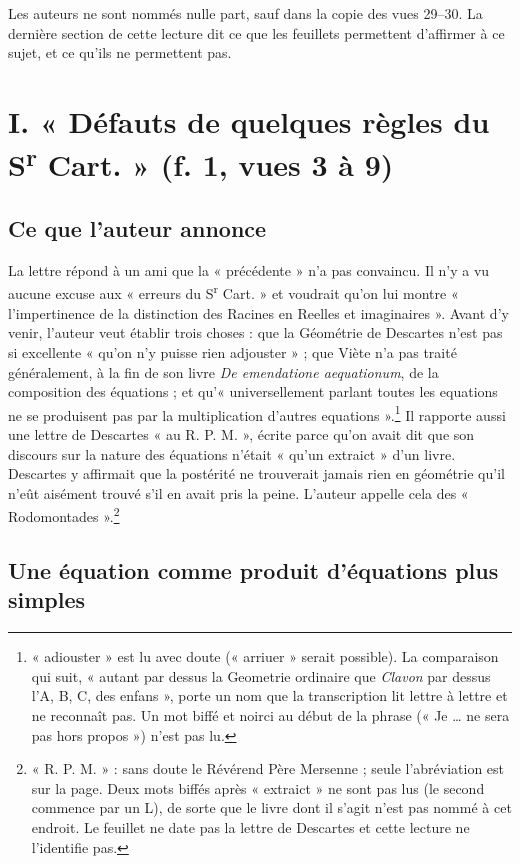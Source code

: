 \documentclass[11pt,a4paper]{article}
\begin{document}
Les auteurs ne sont nommés nulle part, sauf dans la copie des vues 29–30. La
dernière section de cette lecture dit ce que les feuillets permettent
d'affirmer à ce sujet, et ce qu'ils ne permettent pas.

\section*{I. « Défauts de quelques règles du S\textsuperscript{r} Cart. » (f. 1, vues 3 à 9)}

\subsection*{Ce que l'auteur annonce}

La lettre répond à un ami que la « précédente » n'a pas convaincu. Il n'y a vu
aucune excuse aux « erreurs du S\textsuperscript{r} Cart. » et voudrait qu'on
lui montre « l'impertinence de la distinction des Racines en Reelles et
imaginaires ». Avant d'y venir, l'auteur veut établir trois choses : que la
Géométrie de Descartes n'est pas si excellente « qu'on n'y puisse rien
adjouster » ; que Viète n'a pas traité généralement, à la fin de son livre
\emph{De emendatione aequationum}, de la composition des équations ; et
qu'« universellement parlant toutes les equations ne se produisent pas par la
multiplication d'autres equations ».\footnote{« adiouster » est lu avec doute
(« arriuer » serait possible). La comparaison qui suit, « autant par dessus la
Geometrie ordinaire que \emph{Clavon} par dessus l'A, B, C, des enfans », porte
un nom que la transcription lit lettre à lettre et ne reconnaît pas. Un mot
biffé et noirci au début de la phrase (« Je \ldots{} ne sera pas hors
propos ») n'est pas lu.} Il rapporte aussi une lettre de Descartes « au R. P. M. »,
écrite parce qu'on avait dit que son discours sur la nature des équations
n'était « qu'un extraict » d'un livre. Descartes y affirmait que la postérité ne
trouverait jamais rien en géométrie qu'il n'eût aisément trouvé s'il en avait
pris la peine. L'auteur appelle cela des « Rodomontades ».\footnote{« R. P.
M. » : sans doute le Révérend Père Mersenne ; seule l'abréviation est sur la
page. Deux mots biffés après « extraict » ne sont pas lus (le second commence
par un L), de sorte que le livre dont il s'agit n'est pas nommé à cet endroit.
Le feuillet ne date pas la lettre de Descartes et cette lecture ne l'identifie
pas.}

\subsection*{Une équation comme produit d'équations plus simples}
\end{document}
